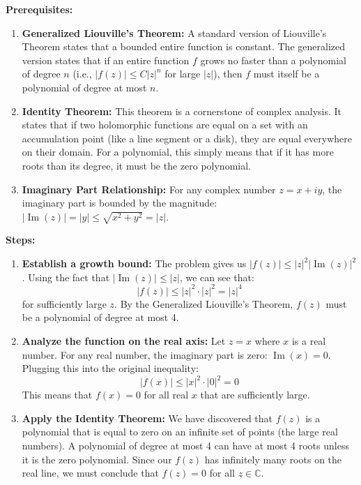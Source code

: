 \begin{solution}
\textbf{Prerequisites:}
\begin{enumerate}
    \item \textbf{Generalized Liouville's Theorem:} A standard version of Liouville's Theorem states that a bounded entire function is constant. The generalized version states that if an entire function $f$ grows no faster than a polynomial of degree $n$ (i.e., $|f(z)| \leq C|z|^n$ for large $|z|$), then $f$ must itself be a polynomial of degree at most $n$.
    \item \textbf{Identity Theorem:} This theorem is a cornerstone of complex analysis. It states that if two holomorphic functions are equal on a set with an accumulation point (like a line segment or a disk), they are equal everywhere on their domain. For a polynomial, this simply means that if it has more roots than its degree, it must be the zero polynomial.
    \item \textbf{Imaginary Part Relationship:} For any complex number $z = x + iy$, the imaginary part is bounded by the magnitude: $|\operatorname{Im}(z)| = |y| \leq \sqrt{x^2 + y^2} = |z|$.
\end{enumerate}

\textbf{Steps:}
\begin{enumerate}
    \item \textbf{Establish a growth bound:} The problem gives us $|f(z)| \leq |z|^2 |\operatorname{Im}(z)|^2$. Using the fact that $|\operatorname{Im}(z)| \leq |z|$, we can see that:
    \[ |f(z)| \leq |z|^2 \cdot |z|^2 = |z|^4 \]
    for sufficiently large $z$. By the Generalized Liouville's Theorem, $f(z)$ must be a polynomial of degree at most 4.

    \item \textbf{Analyze the function on the real axis:} Let $z = x$ where $x$ is a real number. For any real number, the imaginary part is zero: $\operatorname{Im}(x) = 0$.
    Plugging this into the original inequality:
    \[ |f(x)| \leq |x|^2 \cdot |0|^2 = 0 \]
    This means that $f(x) = 0$ for all real $x$ that are sufficiently large.

    \item \textbf{Apply the Identity Theorem:} We have discovered that $f(z)$ is a polynomial that is equal to zero on an infinite set of points (the large real numbers). 
    A polynomial of degree at most 4 can have at most 4 roots unless it is the zero polynomial. Since our $f(z)$ has infinitely many roots on the real line, we must conclude that $f(z) = 0$ for all $z \in \mathbb{C}$.


\end{enumerate}
\end{solution}
